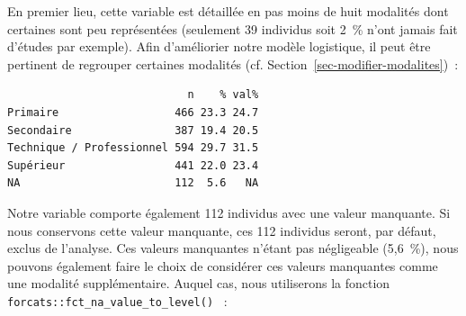 \documentclass[
  letterpaper,
  DIV=11,
  numbers=noendperiod,
  oneside]{scrreprt}
\newenvironment{Shaded}{\begin{snugshade}}{\end{snugshade}}
\newcommand{\AttributeTok}[1]{\textcolor[rgb]{0.40,0.45,0.13}{#1}}
\newcommand{\FunctionTok}[1]{\textcolor[rgb]{0.28,0.35,0.67}{#1}}
\newcommand{\NormalTok}[1]{\textcolor[rgb]{0.00,0.23,0.31}{#1}}
\newcommand{\OtherTok}[1]{\textcolor[rgb]{0.00,0.23,0.31}{#1}}
\newcommand{\SpecialCharTok}[1]{\textcolor[rgb]{0.37,0.37,0.37}{#1}}
\newcommand{\StringTok}[1]{\textcolor[rgb]{0.13,0.47,0.30}{#1}}
\begin{document}
En premier lieu, cette variable est détaillée en pas moins de huit
modalités dont certaines sont peu représentées (seulement 39 individus
soit 2~\% n'ont jamais fait d'études par exemple). Afin d'améliorier
notre modèle logistique, il peut être pertinent de regrouper certaines
modalités (cf. Section~\ref{sec-modifier-modalites})~:

\begin{Shaded}
\end{Shaded}

\begin{verbatim}
                            n    % val%
Primaire                  466 23.3 24.7
Secondaire                387 19.4 20.5
Technique / Professionnel 594 29.7 31.5
Supérieur                 441 22.0 23.4
NA                        112  5.6   NA
\end{verbatim}

Notre variable comporte également 112 individus avec une valeur
manquante. Si nous conservons cette valeur manquante, ces 112 individus
seront, par défaut, exclus de l'analyse. Ces valeurs manquantes n'étant
pas négligeable (5,6~\%), nous pouvons également faire le choix de
considérer ces valeurs manquantes comme une modalité supplémentaire.
Auquel cas, nous utiliserons la fonction
\texttt{forcats::fct\_na\_value\_to\_level()} ~:
\end{document}

